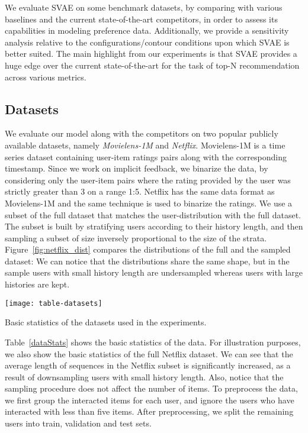 \documentclass[sigconf]{acmart}
\numberwithin{equation}{section}
\begin{document}
We evaluate SVAE on some benchmark datasets, by comparing with various
baselines and the current state-of-the-art competitors, in order to
assess its capabilities in modeling preference data. Additionally, we
provide a sensitivity analysis relative to the configurations/contour
conditions upon which SVAE is better suited. The main highlight from
our experiments is that SVAE provides a huge edge over the current
state-of-the-art for the task of top-N recommendation across various
metrics. 



\vspace*{-5mm}
\subsection{Datasets}
We evaluate our model along with the competitors on two popular
publicly available datasets, namely \textit{Movielens-1M} and
\textit{Netflix}. 
\textrm{Movielens-1M} is a time series dataset containing
user-item ratings pairs along with the corresponding
timestamp. Since we work on implicit feedback, we binarize the
data, by considering only the user-item pairs where the rating provided
by the user was strictly greater than 3 on a range 1:5. 
\textrm{Netflix} has the same data format as \textrm{Movielens-1M} and
the same technique is used to binarize the ratings. We use a subset
of the full dataset that matches the user-distribution with the
full dataset. The subset is built by stratifying users according to
their history length, and then sampling a subset of size inversely
proportional to the size of the
strata. Figure~\ref{fig:netflix_dist} compares the distributions of
the full and the sampled dataset: We can notice that the
distributions share the same shape, but in the sample users with
small history length are undersampled whereas users with large
histories are kept.



\begin{table}
\begin{center}
\texttt{[image: table-datasets]}
\end{center}
\caption{Basic statistics of the datasets used in the experiments.}
\label{dataStats}
\end{table}

Table~\ref{dataStats} shows the basic statistics of the data. For
illustration purposes, we also show the basic statistics of the full
Netflix dataset. We can see that the average length of sequences in
the Netflix subset is significantly increased, as a result of
downsampling users with small history length. Also, notice that the
sampling procedure does not affect the number of items. 
To preprocess the data, we
first group the interacted items for each user, and ignore the users
who have interacted with less than five items. After preprocessing, we
split the remaining users into train, validation and test sets. 
\end{document}
